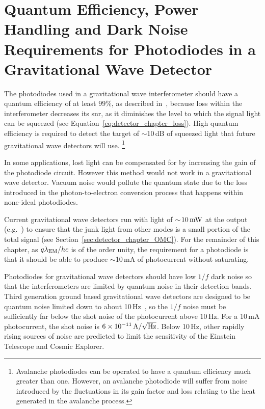 \section{Quantum Efficiency, Power Handling and Dark Noise Requirements for Photodiodes in a Gravitational Wave Detector}
\label{sec:pd_chapter_grav_wave_ifo_requirments}
\par
The photodiodes used in a gravitational wave interferometer should have a quantum efficiency of at least $99\%$, as described in~\cite{A+HAM6_design_requirements}, because loss within the interferometer decreases its \gls{snr}, as it diminishes the level to which the signal light can be squeezed (see Equation~\ref{eq:detector_chapter_loss}). High quantum efficiency is required to detect the target of $\sim\!$10\,dB of squeezed light that future gravitational wave detectors will use\cite{Hall2020,Reitze2019,Hild2011}. \footnote{Avalanche photodiodes can be operated to have a quantum efficiency much greater than one. However, an avalanche photodiode will suffer from noise introduced by the fluctuations in its gain factor and loss relating to the heat generated in the avalanche process.}
\par
In some applications, lost light can be compensated for by increasing the gain of the photodiode circuit. However this method would not work in a gravitational wave detector. Vacuum noise would pollute the quantum state due to the loss introduced in the photon-to-electron conversion process that happens within none-ideal photodiodes.
\par
Current gravitational wave detectors run with light of $\sim\!10\,\rm{mW}$ at the output (e.g.~\cite{Prijatelj2012}) to ensure that the junk light from other modes is a small portion of the total signal (see Section~\ref{sec:detector_chapter_OMC}). For the remainder of this chapter, as  $q\lambda_{\rm{EM}}/hc$ is of the order unity, the requirement for a photodiode is that it should be able to produce $\sim\!$10\,mA of photocurrent without saturating.
\par
Photodiodes for gravitational wave detectors should have low $1/f$ dark noise so that the interferometers are limited by quantum noise in their detection bands. Third generation ground based gravitational wave detectors are designed to be quantum noise limited down to about 10\,Hz~\cite{Punturo2010,Hild2011,Hall2020}, so the $1/f$ noise must be sufficiently far below the shot noise of the photocurrent above $10\,\si{\hertz}$. For a 10\,mA photocurrent, the shot noise is $6\times10^{-11}\,\si{\ampere/\sqrt{\hertz}}$. Below 10\,Hz, other rapidly rising sources of noise are predicted to limit the sensitivity of the Einstein Telescope and Cosmic Explorer.
